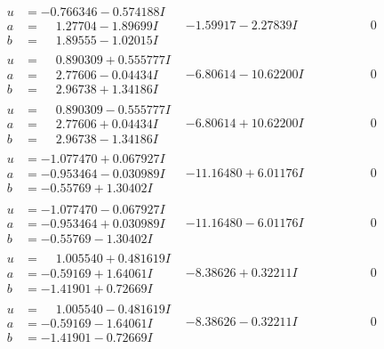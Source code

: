 \documentclass[1p]{elsarticle_modified}
\theoremstyle{definition}
\begin{document}
$$\begin{array}{c|c|c}
\begin{aligned}
u &= -0.766346 - 0.574188 I \\
a &= \phantom{-}1.27704 - 1.89699 I \\
b &= \phantom{-}1.89555 - 1.02015 I\end{aligned}
 & -1.59917 - 2.27839 I & \phantom{-0.000000 } 0 \\ \hline\begin{aligned}
u &= \phantom{-}0.890309 + 0.555777 I \\
a &= \phantom{-}2.77606 - 0.04434 I \\
b &= \phantom{-}2.96738 + 1.34186 I\end{aligned}
 & -6.80614 - 10.62200 I & \phantom{-0.000000 } 0 \\ \hline\begin{aligned}
u &= \phantom{-}0.890309 - 0.555777 I \\
a &= \phantom{-}2.77606 + 0.04434 I \\
b &= \phantom{-}2.96738 - 1.34186 I\end{aligned}
 & -6.80614 + 10.62200 I & \phantom{-0.000000 } 0 \\ \hline\begin{aligned}
u &= -1.077470 + 0.067927 I \\
a &= -0.953464 - 0.030989 I \\
b &= -0.55769 + 1.30402 I\end{aligned}
 & -11.16480 + 6.01176 I & \phantom{-0.000000 } 0 \\ \hline\begin{aligned}
u &= -1.077470 - 0.067927 I \\
a &= -0.953464 + 0.030989 I \\
b &= -0.55769 - 1.30402 I\end{aligned}
 & -11.16480 - 6.01176 I & \phantom{-0.000000 } 0 \\ \hline\begin{aligned}
u &= \phantom{-}1.005540 + 0.481619 I \\
a &= -0.59169 + 1.64061 I \\
b &= -1.41901 + 0.72669 I\end{aligned}
 & -8.38626 + 0.32211 I & \phantom{-0.000000 } 0 \\ \hline\begin{aligned}
u &= \phantom{-}1.005540 - 0.481619 I \\
a &= -0.59169 - 1.64061 I \\
b &= -1.41901 - 0.72669 I\end{aligned}
 & -8.38626 - 0.32211 I & \phantom{-0.000000 } 0 \\ \hline\begin{aligned}

\end{aligned}
\end{array}$$
\end{document}
